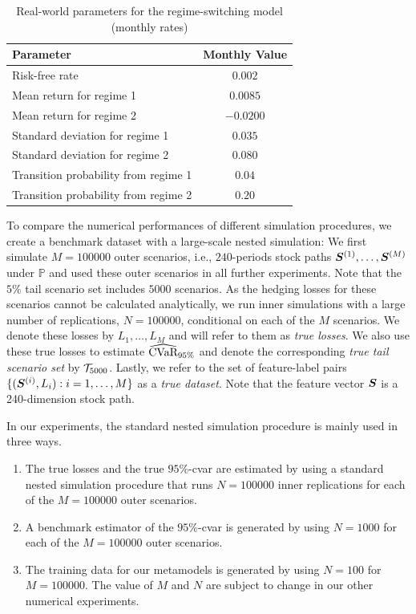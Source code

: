 \begin{table}[ht]
    \centering
    \begin{tabular}{lc}
        \toprule
        \textbf{Parameter}  & \textbf{Monthly Value} \\
        \midrule
        Risk-free rate & $0.002$ \\
        Mean return for regime 1  & $0.0085$ \\
        Mean return for regime 2   & $-0.0200$ \\
        Standard deviation for regime 1  & $0.035$ \\
        Standard deviation for regime 2  & $0.080$ \\
        Transition probability from regime 1  & $0.04$ \\
        Transition probability from regime 2  & $0.20$ \\
        \bottomrule
    \end{tabular}
    \caption{Real-world parameters for the regime-switching model (monthly rates)}
    \label{tab:regime_params}
\end{table}

To compare the numerical performances of different simulation procedures, we create a benchmark dataset with a large-scale nested simulation: We first simulate $M=\num{100000}$ outer scenarios, i.e., $240$-periods stock paths $\bm{S}^{(1)},\ldots,\bm{S}^{(M)}$ under $\mathbb{P}$ and used these outer scenarios in all further experiments.
Note that the $5\%$ tail scenario set includes $\num{5000}$ scenarios.
As the hedging losses for these scenarios cannot be calculated analytically, we run inner simulations with a large number of replications, $N=\num{100000}$, conditional on each of the $M$ scenarios.
We denote these losses by $L_1,\ldots,L_M$ and will refer to them as \textit{true losses}.
We also use these true losses to estimate $\widehat{\mbox{CVaR}}_{95\%}$ and denote the corresponding \textit{true tail scenario set} by $\mathcal{T}_{5000}$.
Lastly, we refer to the set of feature-label pairs $\{(\bm{S}^{(i)}, L_i): i=1,\ldots,M\}$ as a \textit{true dataset}.
Note that the feature vector $\bm{S}$ is a 240-dimension stock path.

In our experiments, the standard nested simulation procedure is mainly used in three ways.
\begin{enumerate}
    \item   The true losses and the true $95\%$-\gls{cvar} are estimated by using a standard nested simulation procedure that runs $N=\num{100000}$ inner replications for each of the $M=\num{100000}$ outer scenarios.
    \item   A benchmark estimator of the $95\%$-\gls{cvar} is generated by using $N=\num{1000}$ for each of the $M=\num{100000}$ outer scenarios.
    \item   The training data for our metamodels is generated by using $N=\num{100}$ for $M=\num{100000}$.
    The value of $M$ and $N$ are subject to change in our other numerical experiments.
\end{enumerate}

